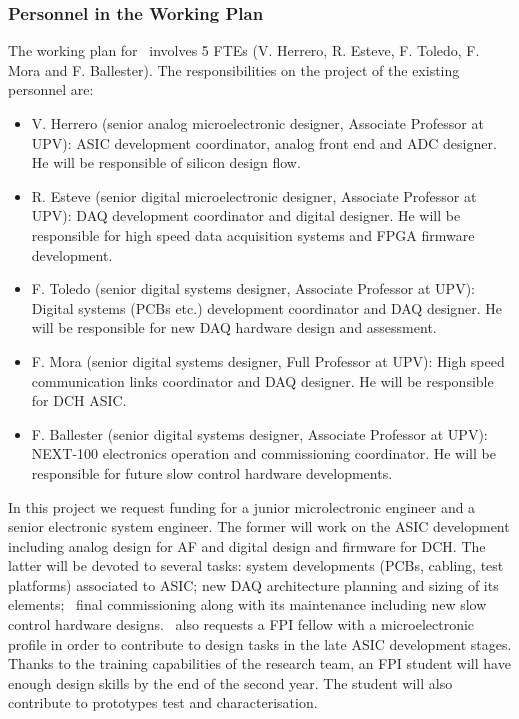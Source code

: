 \subsubsection*{Personnel in the Working Plan}
The working plan for \sUPV\ involves 5 FTEs (V. Herrero, R. Esteve, F. Toledo, F. Mora and F. Ballester). The responsibilities on the project of the existing personnel are:
\begin{itemize}[noitemsep,topsep=0pt,parsep=0pt,partopsep=0pt]
\item V. Herrero (senior analog microelectronic designer, Associate Professor at UPV): ASIC development coordinator, analog front end and ADC designer. He will be responsible of silicon design flow.
\item R. Esteve (senior digital microelectronic designer, Associate Professor at UPV): DAQ development coordinator and digital designer. He will be responsible for high speed data acquisition systems and FPGA firmware development.
\item F. Toledo (senior digital systems designer, Associate Professor at UPV): Digital systems (PCBs etc.) development coordinator and DAQ designer. He will be responsible for new DAQ hardware design and assessment.
\item F. Mora (senior digital systems designer, Full Professor at UPV): High speed communication links coordinator and DAQ designer. He will be responsible for DCH ASIC.
\item F. Ballester (senior digital systems designer, Associate Professor at UPV): NEXT-100 electronics operation and commissioning coordinator. He will be responsible for future slow control hardware developments.
\end{itemize}

In this project we request funding for a junior microlectronic engineer and a senior electronic system engineer. The former will work on the ASIC development including analog design for AF and digital design and firmware for DCH. The latter will be devoted to several tasks: system developments (PCBs, cabling, test platforms) associated to ASIC; new DAQ architecture planning and sizing of its elements; \Next\ final commissioning along with its maintenance including new slow control hardware designs. 
\sUPV\ also requests a FPI fellow with a microelectronic profile in order to contribute to design tasks in the late ASIC development stages. Thanks to the training capabilities of the research team, an FPI student will have enough design skills by the end of the second year. The student will also contribute to prototypes test and characterisation.

